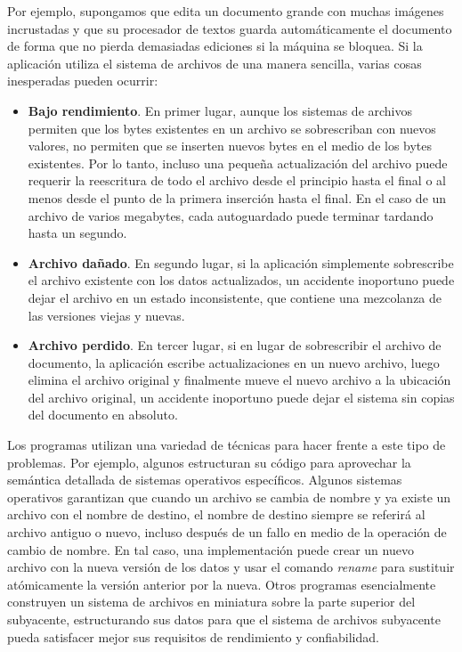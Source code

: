 \documentclass[10pt]{book}
\begin{document}
Por ejemplo, supongamos que edita un documento grande con muchas imágenes incrustadas y que su procesador de textos guarda automáticamente el documento de forma que no pierda demasiadas ediciones si la máquina se bloquea. Si la aplicación utiliza el sistema de archivos de una manera sencilla, varias cosas inesperadas pueden ocurrir:

\begin{itemize}
\item \textbf{Bajo rendimiento}. En primer lugar, aunque los sistemas de archivos permiten que los bytes existentes en un archivo se sobrescriban con nuevos valores, no permiten que se inserten nuevos bytes en el medio de los bytes existentes. Por lo tanto, incluso una pequeña actualización del archivo puede requerir la reescritura de todo el archivo desde el principio hasta el final o al menos desde el punto de la primera inserción hasta el final. En el caso de un archivo de varios megabytes, cada autoguardado puede terminar tardando hasta un segundo.

\item \textbf{Archivo dañado}. En segundo lugar, si la aplicación simplemente sobrescribe el archivo existente con los datos actualizados, un accidente inoportuno puede dejar el archivo en un estado inconsistente, que contiene una mezcolanza de las versiones viejas y nuevas.

\item \textbf{Archivo perdido}. En tercer lugar, si en lugar de sobrescribir el archivo de documento, la aplicación escribe actualizaciones en un nuevo archivo, luego elimina el archivo original y finalmente mueve el nuevo archivo a la ubicación del archivo original, un accidente inoportuno puede dejar el sistema sin copias del documento en absoluto.
\end{itemize}

Los programas utilizan una variedad de técnicas para hacer frente a este tipo de problemas. Por ejemplo, algunos estructuran su código para aprovechar la semántica detallada de sistemas operativos específicos. Algunos sistemas operativos garantizan que cuando un archivo se cambia de nombre y ya existe un archivo con el nombre de destino, el nombre de destino siempre se referirá al archivo antiguo o nuevo, incluso después de un fallo en medio de la operación de cambio de nombre. En tal caso, una implementación puede crear un nuevo archivo con la nueva versión de los datos y usar el comando \textit{rename} para sustituir atómicamente la versión anterior por la nueva. Otros programas esencialmente construyen un sistema de archivos en miniatura sobre la parte superior del subyacente, estructurando sus datos para que el sistema de archivos subyacente pueda satisfacer mejor sus requisitos de rendimiento y confiabilidad.
\end{document}
